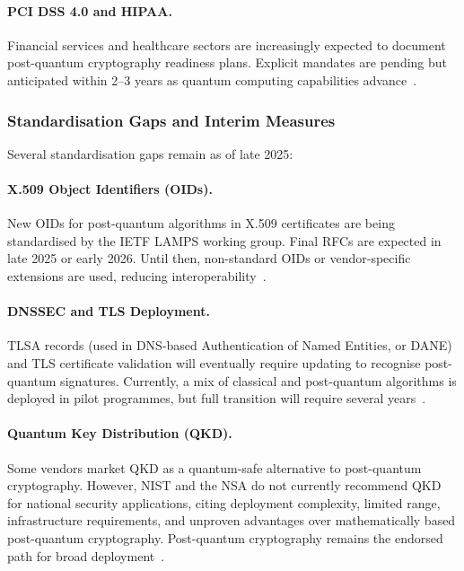 \documentclass[12pt,a4paper]{article}
\begin{document}
\paragraph{PCI DSS 4.0 and HIPAA.}
Financial services and healthcare sectors are increasingly expected to document post-quantum cryptography readiness plans. Explicit mandates are pending but anticipated within 2–3 years as quantum computing capabilities advance~\cite{pci-pqc-readiness-2024}.

\subsubsection{Standardisation Gaps and Interim Measures}

Several standardisation gaps remain as of late 2025:

\paragraph{X.509 Object Identifiers (OIDs).}
New OIDs for post-quantum algorithms in X.509 certificates are being standardised by the IETF LAMPS working group. Final RFCs are expected in late 2025 or early 2026. Until then, non-standard OIDs or vendor-specific extensions are used, reducing interoperability~\cite{ietf-lamps-mldsa-certs-2024,ietf-lamps-composite-sigs-2024}.

\paragraph{DNSSEC and TLS Deployment.}
TLSA records (used in DNS-based Authentication of Named Entities, or DANE) and TLS certificate validation will eventually require updating to recognise post-quantum signatures. Currently, a mix of classical and post-quantum algorithms is deployed in pilot programmes, but full transition will require several years~\cite{ietf-dane-pqc-2024}.

\paragraph{Quantum Key Distribution (QKD).}
Some vendors market QKD as a quantum-safe alternative to post-quantum cryptography. However, NIST and the NSA do not currently recommend QKD for national security applications, citing deployment complexity, limited range, infrastructure requirements, and unproven advantages over mathematically based post-quantum cryptography. Post-quantum cryptography remains the endorsed path for broad deployment~\cite{nist-pqc-faq-2024,nsa-qkd-position-2023}.
\end{document}

